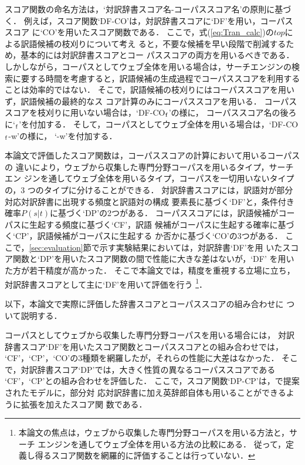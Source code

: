 \documentclass[japanese]{jnlp_1.3a}
\begin{document}
スコア関数の命名方法は，`対訳辞書スコア名-コーパススコア名'の原則に基づ
く．
例えば，スコア関数`DF-CO'は，対訳辞書スコアに`DF'を用い，コーパススコア
に`CO'を用いたスコア関数である．
ここで，式(\ref{eq:Tran_calc})の$top$による訳語候補の枝刈りについて考え
ると，不要な候補を早い段階で削減するため，基本的には対訳辞書スコアとコー
パススコアの両方を用いるべきである．
しかしながら，コーパスとしてウェブ全体を用いる場合は，サーチエンジンの検
索に要する時間を考慮すると，訳語候補の生成過程でコーパススコアを利用する
ことは効率的ではない．
そこで，訳語候補の枝刈りにはコーパススコアを用いず，訳語候補の最終的なス
コア計算のみにコーパススコアを用いる．
コーパススコアを枝刈りに用いない場合は，`DF-CO${\rm _f}$'の様に，
コーパススコア名の後ろに`${\rm _f}$'を付加する．
そして，コーパスとしてウェブ全体を用いる場合は，`DF-CO${\rm _f}$-w'の様に，
`-w'を付加する．

本論文で評価したスコア関数は，コーパススコアの計算において用いるコーパスの
違いにより，ウェブから収集した専門分野コーパスを用いるタイプ，サーチエン
ジンを通してウェブ全体を用いるタイプ，コーパスを一切用いないタイプの，3
つのタイプに分けることができる．
対訳辞書スコアには，訳語対が部分対応対訳辞書に出現する頻度と訳語対の構成
要素長に基づく`DF'と，条件付き確率$P(s|t)$に基づく`DP'の2つがある．
コーパススコアには，訳語候補がコーパスに生起する頻度に基づく`CF'，訳語
候補がコーパスに生起する確率に基づく`CP'，訳語候補がコーパスに生起する
か否かに基づく`CO'の3つがある．
ここで，\ref{sec:evaluation}節で示す実験結果においては，対訳辞書`DF'を用
いたスコア関数と`DP'を用いたスコア関数の間で性能に大きな差はないが，`DF'
を用いた方が若干精度が高かった．
そこで本論文では，精度を重視する立場に立ち，
対訳辞書スコアとして主に`DF'を用いて評価を行う
\footnote{
本論文の焦点は，ウェブから収集した専門分野コーパスを用いる方法と，サーチ
エンジンを通してウェブ全体を用いる方法の比較にある．
従って，定義し得るスコア関数を網羅的に評価することは行っていない．
}．

以下，本論文で実際に評価した辞書スコアとコーパススコアの組み合わせに
ついて説明する．

コーパスとしてウェブから収集した専門分野コーパスを用いる場合には，
対訳辞書スコア`DF'を用いたスコア関数とコーパススコアとの組み合わせでは，
`CF'，`CP'，`CO'の3種類を網羅したが，それらの性能に大差はなかった．
そこで，対訳辞書スコア`DP'では，大きく性質の異なるコーパススコアである
`CF'，`CP'との組み合わせを評価した．
ここで，スコア関数`DP-CP'は，\cite{Fujii00}で提案されたモデルに，部分対
応対訳辞書に加え英辞郎自体も用いることができるように拡張を加えたスコア関
数である．
\end{document}
